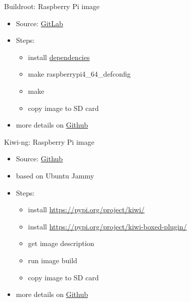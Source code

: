 \documentclass{beamer}
\begin{document}
\begin{frame}{Buildroot: Raspberry Pi image}
	\begin{itemize}
		\item Source: \href{https://gitlab.com/buildroot.org/buildroot/}{GitLab}
		\item Steps:
		\begin{itemize}
			\item install \href{https://buildroot.org/downloads/manual/manual.html\#requirement}{dependencies}
			\item make raspberrypi4\_64\_defconfig
			\item make
			\item copy image to SD card
		\end{itemize}
		\item more details on \href{https://github.com/tomirgang/eh21_maintainable_linux/tree/main/examples/first_build_rpi4/buildroot}{Github}
	\end{itemize}
\end{frame}

\begin{frame}{Kiwi-ng: Raspberry Pi image}
	\begin{itemize}
		\item Source: \href{https://github.com/OSInside/kiwi-descriptions/tree/main/ubuntu/aarch64/ubuntu-jammy-rpi}{Github}
		\item based on Ubuntu Jammy
		\item Steps:
		\begin{itemize}
			\item install \url{https://pypi.org/project/kiwi/}
			\item install \url{https://pypi.org/project/kiwi-boxed-plugin/}
			\item get image description
			\item run image build
			\item copy image to SD card
		\end{itemize}
		\item more details on \href{https://github.com/tomirgang/eh21_maintainable_linux/tree/main/examples/first_build_rpi4/kiwi-ng}{Github}
	\end{itemize}
\end{frame}
\end{document}
